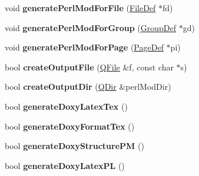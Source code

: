 \begin{DoxyCompactItemize}
\item 
\hypertarget{class_perl_mod_generator_aeb4a73d00978a65e9a9139d1fbe2a0ac}{void {\bfseries generate\-Perl\-Mod\-For\-File} (\hyperlink{class_file_def}{File\-Def} $\ast$fd)}\label{class_perl_mod_generator_aeb4a73d00978a65e9a9139d1fbe2a0ac}

\item 
\hypertarget{class_perl_mod_generator_a675c0c15b677b2f5014d80c7727bb91f}{void {\bfseries generate\-Perl\-Mod\-For\-Group} (\hyperlink{class_group_def}{Group\-Def} $\ast$gd)}\label{class_perl_mod_generator_a675c0c15b677b2f5014d80c7727bb91f}

\item 
\hypertarget{class_perl_mod_generator_a347fa83c53806ceac03e96aeee0b3a33}{void {\bfseries generate\-Perl\-Mod\-For\-Page} (\hyperlink{class_page_def}{Page\-Def} $\ast$pi)}\label{class_perl_mod_generator_a347fa83c53806ceac03e96aeee0b3a33}

\item 
\hypertarget{class_perl_mod_generator_a347c61573d0d2ef4f313985b8a532a8f}{bool {\bfseries create\-Output\-File} (\hyperlink{class_q_file}{Q\-File} \&f, const char $\ast$s)}\label{class_perl_mod_generator_a347c61573d0d2ef4f313985b8a532a8f}

\item 
\hypertarget{class_perl_mod_generator_a68633c9b505a7d8f8302e466bdf4c06f}{bool {\bfseries create\-Output\-Dir} (\hyperlink{class_q_dir}{Q\-Dir} \&perl\-Mod\-Dir)}\label{class_perl_mod_generator_a68633c9b505a7d8f8302e466bdf4c06f}

\item 
\hypertarget{class_perl_mod_generator_a6e9fba2e50e37946e2d6f11ccbc52725}{bool {\bfseries generate\-Doxy\-Latex\-Tex} ()}\label{class_perl_mod_generator_a6e9fba2e50e37946e2d6f11ccbc52725}

\item 
\hypertarget{class_perl_mod_generator_a4e660aabc4a3d0f044ab10816510d51a}{bool {\bfseries generate\-Doxy\-Format\-Tex} ()}\label{class_perl_mod_generator_a4e660aabc4a3d0f044ab10816510d51a}

\item 
\hypertarget{class_perl_mod_generator_a07cb7800f5145f0a65f9acdf24903c91}{bool {\bfseries generate\-Doxy\-Structure\-P\-M} ()}\label{class_perl_mod_generator_a07cb7800f5145f0a65f9acdf24903c91}

\item 
\hypertarget{class_perl_mod_generator_abb7e293b981eac61f4f177ba379390d6}{bool {\bfseries generate\-Doxy\-Latex\-P\-L} ()}\label{class_perl_mod_generator_abb7e293b981eac61f4f177ba379390d6}


\end{DoxyCompactItemize}
